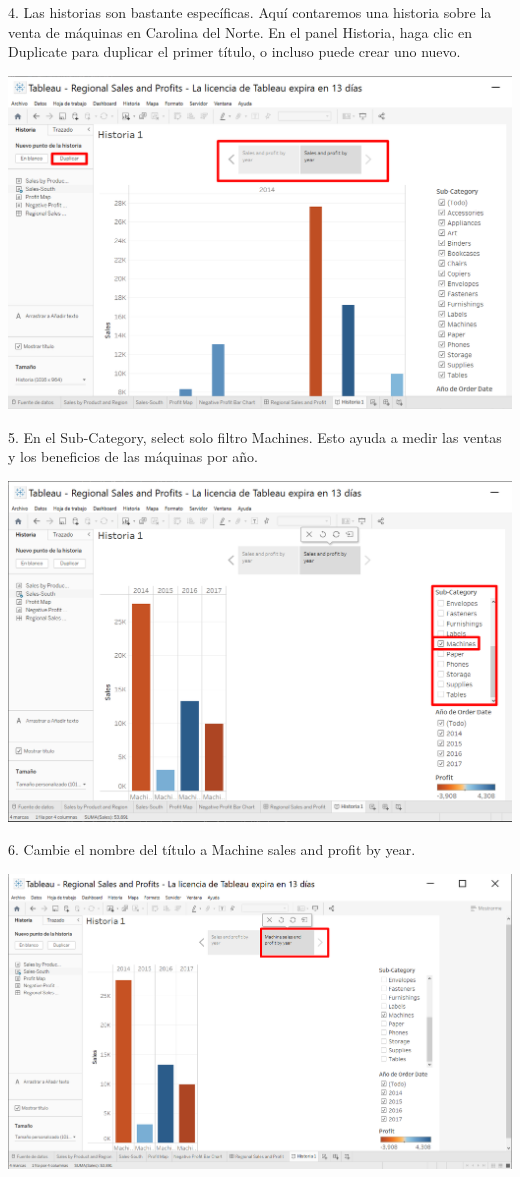 \documentclass[12pt,letterpaper]{article}
\begin{document}
4. Las historias son bastante específicas. Aquí contaremos una historia sobre la venta de máquinas
en Carolina del Norte. En el panel Historia, haga clic en Duplicate para duplicar el primer
título, o incluso puede crear uno nuevo.
\begin{center}
    \includegraphics[width=16cm]{img/62.png}  
\end{center}
5. En el Sub-Category, select solo filtro Machines. Esto ayuda a medir las ventas y los
beneficios de las máquinas por año.
\begin{center}
    \includegraphics[width=16cm]{img/63.png}  
\end{center}
6. Cambie el nombre del título a Machine sales and profit by year.
\begin{center}
    \includegraphics[width=16cm]{img/64.png}  
\end{center}
\end{document}
